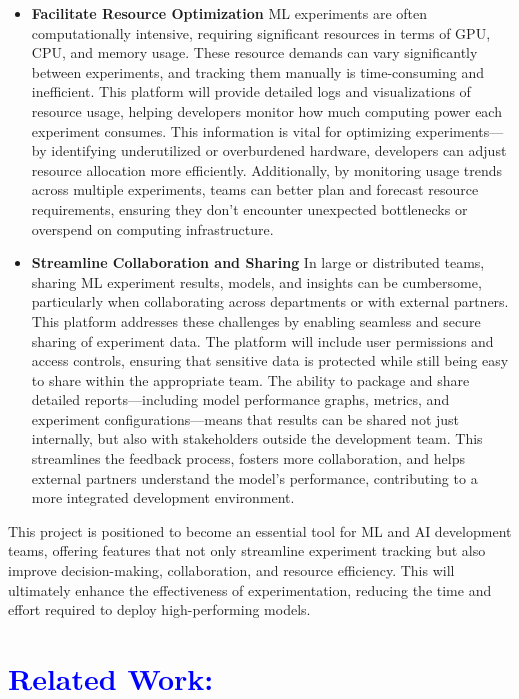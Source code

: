 \documentclass[12pt]{article}
\newcommand{\tb}{\textcolor{blue}}
\begin{document}
\begin{itemize}
\item \textbf{Facilitate Resource Optimization}
ML experiments are often computationally intensive, requiring significant resources in terms of GPU, CPU, and memory usage. These resource demands can vary significantly between experiments, and tracking them manually is time-consuming and inefficient. This platform will provide detailed logs and visualizations of resource usage, helping developers monitor how much computing power each experiment consumes. This information is vital for optimizing experiments—by identifying underutilized or overburdened hardware, developers can adjust resource allocation more efficiently. Additionally, by monitoring usage trends across multiple experiments, teams can better plan and forecast resource requirements, ensuring they don’t encounter unexpected bottlenecks or overspend on computing infrastructure.

\item \textbf{Streamline Collaboration and Sharing}
In large or distributed teams, sharing ML experiment results, models, and insights can be cumbersome, particularly when collaborating across departments or with external partners. This platform addresses these challenges by enabling seamless and secure sharing of experiment data. The platform will include user permissions and access controls, ensuring that sensitive data is protected while still being easy to share within the appropriate team. The ability to package and share detailed reports—including model performance graphs, metrics, and experiment configurations—means that results can be shared not just internally, but also with stakeholders outside the development team. This streamlines the feedback process, fosters more collaboration, and helps external partners understand the model’s performance, contributing to a more integrated development environment.

\end{itemize}

This project is positioned to become an essential tool for ML and AI development teams, offering features that not only streamline experiment tracking but also improve decision-making, collaboration, and resource efficiency. This will ultimately enhance the effectiveness of experimentation, reducing the time and effort required to deploy high-performing models.

\section{\tb {Related Work:}}
\end{document}

